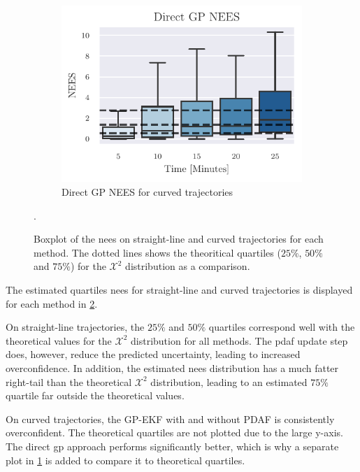 \begin{figure}[h]
\begin{subfigure}{0.65\textwidth}
        \includegraphics{figures/curved_line_stats/direct_gp_nees.pdf}
        \caption{Direct GP NEES for curved trajectories}
        \label{fig:stats_curved_nees_direct}
    \end{subfigure}
    \caption{Boxplot of the \acrshort{nees} on straight-line and curved trajectories for each method. The dotted lines shows the theoritical quartiles ($25\%$, $50\%$ and $75\%$) for the $\mathcal{X}^2$ distribution as a comparison.}.
    \label{fig:stats_curved_nees}
\end{figure}
The estimated quartiles \acrshort{nees} for straight-line and curved trajectories is displayed for each method in \cref{fig:stats_curved_nees}.

On straight-line trajectories, the $25\%$ and $50\%$ quartiles correspond well with the theoretical values for the $\mathcal{X}^2$ distribution for all methods. The \acrshort{pdaf} update step does, however, reduce the predicted uncertainty, leading to increased overconfidence. In addition, the estimated \acrshort{nees} distribution has a much fatter right-tail than the theoretical $\mathcal{X}^2$ distribution, leading to an estimated $75\%$ quartile far outside the theoretical values.

On curved trajectories, the GP-EKF with and without PDAF is consistently overconfident. The theoretical quartiles are not plotted due to the large y-axis. The direct \acrshort{gp} approach performs significantly better, which is why a separate plot in \cref{fig:stats_curved_nees_direct} is added to compare it to theoretical quartiles. 




